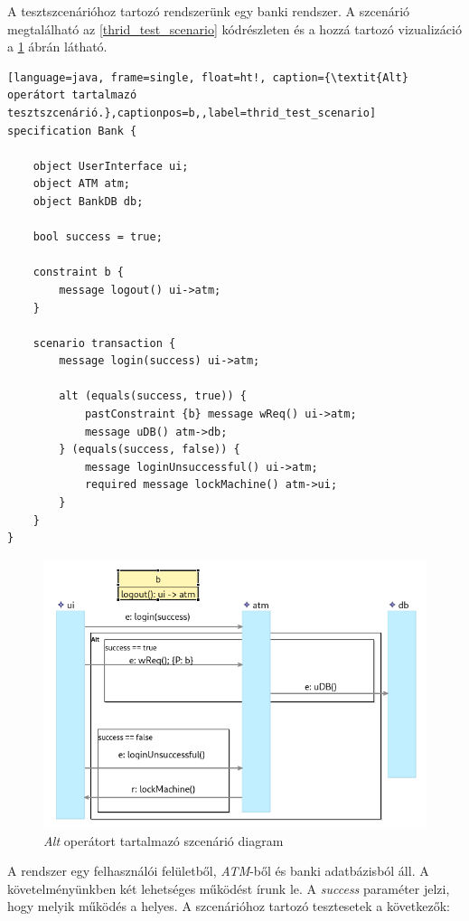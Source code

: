 A tesztszcenárióhoz tartozó rendszerünk egy banki rendszer.
A szcenárió megtalálható az \ref{thrid_test_scenario} kódrészleten és a hozzá tartozó vizualizáció a \ref{third_visualisation} ábrán látható.

\begin{lstlisting}[language=java, frame=single, float=ht!, caption={\textit{Alt} operátort tartalmazó tesztszcenárió.},captionpos=b,,label=thrid_test_scenario]
specification Bank {

    object UserInterface ui;
    object ATM atm;
    object BankDB db;

    bool success = true;

    constraint b {
        message logout() ui->atm;
    }

    scenario transaction {
        message login(success) ui->atm;

        alt (equals(success, true)) {
            pastConstraint {b} message wReq() ui->atm;
            message uDB() atm->db;
        } (equals(success, false)) {
            message loginUnsuccessful() ui->atm;
            required message lockMachine() atm->ui;
        }
    }
}
\end{lstlisting}

\begin{figure}[!ht]
    \centering
    \includegraphics[width=120mm, keepaspectratio]{figures/diagramAltExample.png}
    \caption{\textit{Alt} operátort tartalmazó szcenárió diagram}
    \label{third_visualisation}
\end{figure}

A rendszer egy felhasználói felületből, \textit{ATM}-ből és banki adatbázisból áll.
A követelményünkben két lehetséges működést írunk le.
A \textit{success} paraméter jelzi, hogy melyik működés a helyes.
A szcenárióhoz tartozó tesztesetek a következők:

